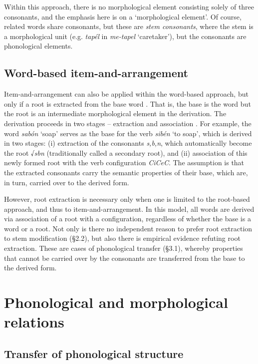 \documentclass[output=paper,
modfonts
]{LSP/langsci}
\begin{document}
	Within this approach, there is no morphological element consisting
	solely of three consonants, and the emphasis here is on a `morphological
	element'. Of course, related words share consonants, but these are
	\emph{stem consonants}, where the stem is a morphological unit (e.g.
	\emph{tapél} in \emph{me-tapel} `caretaker'), but the consonants are
	phonological elements.
	
	\subsection{Word-based item-and-arrangement}\label{word-based-item-and-arrangement}
	Item-and-arrangement can also be applied within the word-based approach,
but only if a root is extracted from the base word \citep{ornan1983a, bolozky1978a}. That is, the base is the word but the root is an intermediate
morphological element in the derivation. The derivation proceeds in two
stages -- extraction and association \citep{batel1986a, batel1989a}. For example,
the word \emph{sabón} `soap' serves as the base for the verb
\emph{sibén} `to soap', which is derived in two stages: (i) extraction
of the consonants \emph{s,b,n}, which automatically become the root
√\emph{sbn} (traditionally called a secondary root), and (ii)
association of this newly formed root with the verb configuration
\emph{CiCeC}. The assumption is that the extracted consonants carry the
semantic properties of their base, which are, in turn, carried over to
the derived form.

However, root extraction is necessary only when one is limited to the
root-based approach, and thus to item-and-arrangement. In this model,
all words are derived via association of a root with a configuration,
regardless of whether the base is a word or a root. Not only is there no
independent reason to prefer root extraction to stem modification
(§2.2), but also there is empirical evidence refuting root extraction. These
are cases of phonological transfer (§3.1), whereby properties that
cannot be carried over by the consonants are transferred from the base
to the derived form.

\section{Phonological and morphological
relations}\label{phonological-and-morphological-relations}

\subsection{Transfer of phonological structure}\label{transfer-of-phonological-structure}
\end{document}
